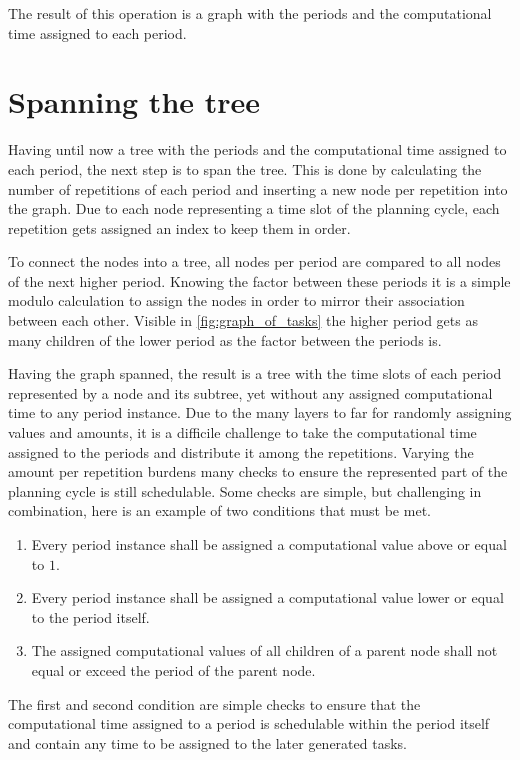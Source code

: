 The result of this operation is a graph with the periods and the computational time assigned to each period.

\section{Spanning the tree}\label{subsec:impl:spanning-the-tree}
Having until now a tree with the periods and the computational time assigned to each period, the next step is to span the tree.
This is done by calculating the number of repetitions of each period and inserting a new node per repetition into the graph.
Due to each node representing a time slot of the planning cycle, each repetition gets assigned an index to keep them in order.

To connect the nodes into a tree, all nodes per period are compared to all nodes of the next higher period.
Knowing the factor between these periods it is a simple modulo calculation to assign the nodes in order to mirror their association between each other.
Visible in \cref{fig:graph_of_tasks} the higher period gets as many children of the lower period as the factor between the periods is.

Having the graph spanned, the result is a tree with the time slots of each period represented by a node and its subtree, yet without any assigned computational time to any period instance.
Due to the many layers to far for randomly assigning values and amounts, it is a difficile challenge to take the computational time assigned to the periods and distribute it among the repetitions.
Varying the amount per repetition burdens many checks to ensure the represented part of the planning cycle is still schedulable.
Some checks are simple, but challenging in combination, here is an example of two conditions that must be met.

\begin{enumerate}
    \item Every period instance shall be assigned a computational value above or equal to $1$.
    \item Every period instance shall be assigned a computational value lower or equal to the period itself.
    \item The assigned computational values of all children of a parent node shall not equal or exceed the period of the parent node.
\end{enumerate}

The first and second condition are simple checks to ensure that the computational time assigned to a period is schedulable within the period itself and contain any time to be assigned to the later generated tasks.

